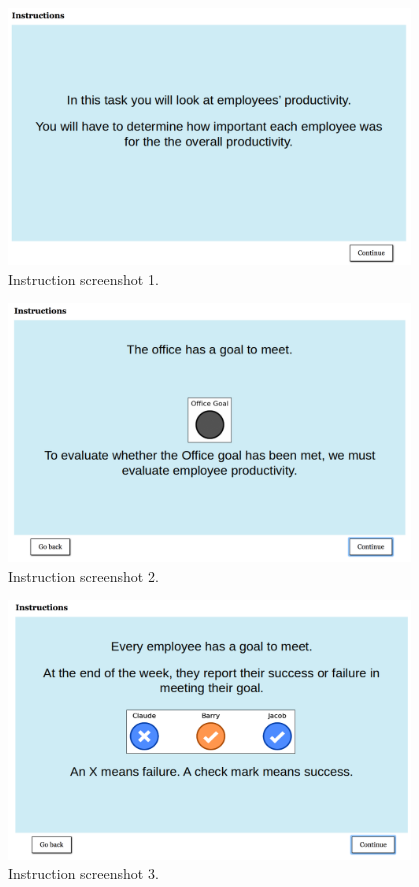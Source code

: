 \documentclass[11pt]{article}
\begin{document}
\begin{figure}[H]
	\centering
	\includegraphics[width=0.95\textwidth]{screenshot_1}
	\caption{Instruction screenshot 1.}
	\label{fig:screenshot_1}
\end{figure}
\begin{figure}[H]
	\centering
	\includegraphics[width=0.95\textwidth]{screenshot_2}
	\caption{Instruction screenshot 2.}
	\label{fig:screenshot_2}
\end{figure}
\begin{figure}[H]
	\centering
	\includegraphics[width=0.95\textwidth]{screenshot_3}
	\caption{Instruction screenshot 3.}
	\label{fig:screenshot_3}
\end{figure}
\end{document}
